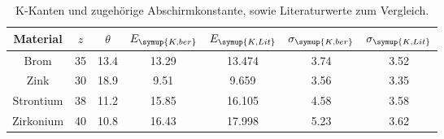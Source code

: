 \begin{table}[!htp]
\centering
\caption{K-Kanten und zugehörige Abschirmkonstante, sowie Literaturwerte zum Vergleich.}
\label{tab:messung}
\begin{tabular}{c c c c c c c}
\toprule
{{Material}} & {{$z$}} & {{$\theta$}} & {{$E_{\symup{K, ber}}$}}  & {{$E_{\symup{K, Lit}}$}}  & {{$\sigma_{\symup{K, ber}}$}} & {{$\sigma_{\symup{K, Lit}}$}} \\
\midrule
Brom &      35  & 13.4 & 13.29 & 13.474 & 3.74  & 3.52 \\
Zink &      30  & 18.9 & 9.51  &  9.659 & 3.56  & 3.35 \\
Strontium & 38  & 11.2 & 15.85 & 16.105 & 4.58  & 3.58 \\
Zirkonium & 40  & 10.8 & 16.43 & 17.998 & 5.23  & 3.62 \\
\bottomrule
\end{tabular}
\end{table}